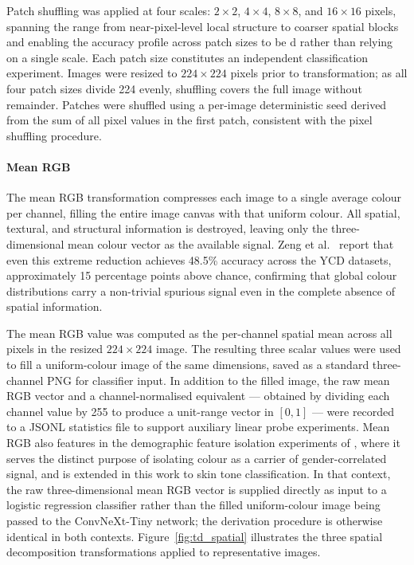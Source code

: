 Patch shuffling was applied at four scales: $2 \times 2$, $4 \times 4$, 
$8 \times 8$, and $16 \times 16$ pixels, spanning the range from 
near-pixel-level local structure to coarser spatial blocks and enabling the 
accuracy profile across patch sizes to be d rather than relying 
on a single scale. Each patch size constitutes an independent classification 
experiment. Images were resized to $224 \times 224$ pixels prior to 
transformation; as all four patch sizes divide 224 evenly, shuffling covers 
the full image without remainder. Patches were shuffled using a per-image 
deterministic seed derived from the sum of all pixel values in the first 
patch, consistent with the pixel shuffling procedure.

\paragraph{Mean RGB}
The mean RGB transformation compresses each image to a single average colour 
per channel, filling the entire image canvas with that uniform colour. All 
spatial, textural, and structural information is destroyed, leaving only the 
three-dimensional mean colour vector as the available signal. Zeng et al.\ 
\cite{Zeng_2024_UnderstandingBiasinLargeScaleVisualDatasets} report that even 
this extreme reduction achieves 48.5\% accuracy across the YCD datasets, 
approximately 15 percentage points above chance, confirming that global 
colour distributions carry a non-trivial spurious signal even in the complete 
absence of spatial information.

The mean RGB value was computed as the per-channel spatial mean across all 
pixels in the resized $224 \times 224$ image. The resulting three scalar 
values were used to fill a uniform-colour image of the same dimensions, saved 
as a standard three-channel PNG for classifier input. In addition to the 
filled image, the raw mean RGB vector and a channel-normalised equivalent 
— obtained by dividing each channel value by 255 to produce a unit-range 
vector in $[0, 1]$ — were recorded to a JSONL statistics file to support 
auxiliary linear probe experiments. Mean RGB also features in the demographic 
feature isolation experiments of 
\cite{Meister_2023_GenderArtifactsinVisualDatasets}, where it serves the 
distinct purpose of isolating colour as a carrier of gender-correlated signal, 
and is extended in this work to skin tone classification. In that context, the 
raw three-dimensional mean RGB vector is supplied directly as input to a 
logistic regression classifier rather than the filled uniform-colour image 
being passed to the ConvNeXt-Tiny network; the derivation procedure is 
otherwise identical in both contexts. Figure~\ref{fig:td_spatial} illustrates the three spatial decomposition transformations applied to representative images.

